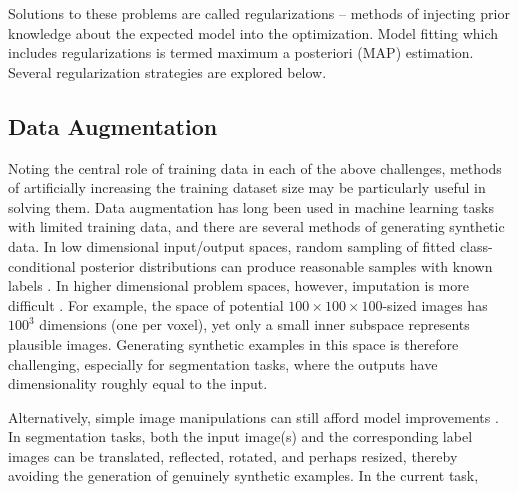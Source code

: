 Solutions to these problems are called regularizations -- methods of injecting prior knowledge about the expected model into the optimization. Model fitting which includes regularizations is termed maximum a posteriori (MAP) estimation. Several regularization strategies are explored below.
\subsection{Data Augmentation}
Noting the central role of training data in each of the above challenges, methods of artificially increasing the training dataset size may be particularly useful in solving them. Data augmentation has long been used in machine learning tasks with limited training data, and there are several methods of generating synthetic data. In low dimensional input/output spaces, random sampling of fitted class-conditional posterior distributions can produce reasonable samples with known labels \cite{Tanner1987}. In higher dimensional problem spaces, however, imputation is more difficult \cite{Goodfellow2014}. For example, the space of potential $100\times100\times100$-sized images has $100^3$ dimensions (one per voxel), yet only a small inner subspace represents plausible images. Generating synthetic examples in this space is therefore challenging, especially for segmentation tasks, where the outputs have dimensionality roughly equal to the input.
\par
Alternatively, simple image manipulations can still afford model improvements \cite{Krizhevsky2012}. In segmentation tasks, both the input image(s) and the corresponding label images can be translated, reflected, rotated, and perhaps resized, thereby avoiding the generation of genuinely synthetic examples. In the current task, 

